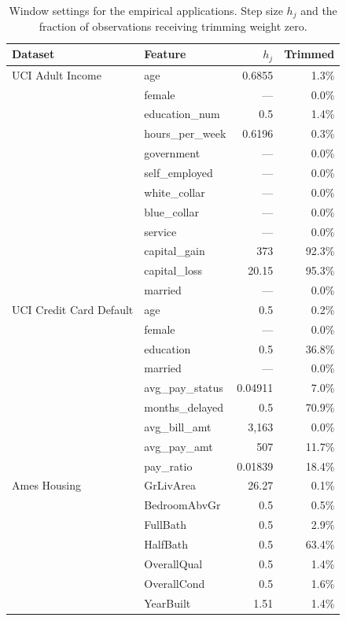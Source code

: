 \documentclass[12pt,a4paper]{article}
\numberwithin{equation}{section}
\theoremstyle{plain}
\theoremstyle{definition}
\begin{document}
	\begin{table}[htbp]
		\centering
		\small
		\begin{threeparttable}
		\caption{Window settings for the empirical applications. Step size $h_j$ and the fraction of observations receiving trimming weight zero.}
		\label{tab:window_settings}
		\begin{tabular}{llrr}
			\toprule
			Dataset & Feature & $h_j$ & Trimmed \\
			\midrule
			UCI Adult Income & age & 0.6855 & 1.3\% \\
			& female & --- & 0.0\% \\
			& education\_num & 0.5 & 1.4\% \\
			& hours\_per\_week & 0.6196 & 0.3\% \\
			& government & --- & 0.0\% \\
			& self\_employed & --- & 0.0\% \\
			& white\_collar & --- & 0.0\% \\
			& blue\_collar & --- & 0.0\% \\
			& service & --- & 0.0\% \\
			& capital\_gain & 373 & 92.3\% \\
			& capital\_loss & 20.15 & 95.3\% \\
			& married & --- & 0.0\% \\
			\midrule
			UCI Credit Card Default & age & 0.5 & 0.2\% \\
			& female & --- & 0.0\% \\
			& education & 0.5 & 36.8\% \\
			& married & --- & 0.0\% \\
			& avg\_pay\_status & 0.04911 & 7.0\% \\
			& months\_delayed & 0.5 & 70.9\% \\
			& avg\_bill\_amt & 3,163 & 0.0\% \\
			& avg\_pay\_amt & 507 & 11.7\% \\
			& pay\_ratio & 0.01839 & 18.4\% \\
			\midrule
			Ames Housing & GrLivArea & 26.27 & 0.1\% \\
			& BedroomAbvGr & 0.5 & 0.5\% \\
			& FullBath & 0.5 & 2.9\% \\
			& HalfBath & 0.5 & 63.4\% \\
			& OverallQual & 0.5 & 1.4\% \\
			& OverallCond & 0.5 & 1.6\% \\
			& YearBuilt & 1.51 & 1.4\% \\

\end{tabular}
\end{threeparttable}
\end{table}
\end{document}

